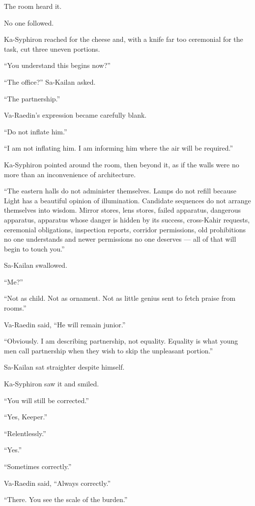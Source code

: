 The room heard it.\par
No one followed.\par
Ka-Syphiron reached for the cheese and, with a knife far too ceremonial for the task, cut three uneven portions.\par
“You understand this begins now?”\par
“The office?” Sa-Kailan asked.\par
“The partnership.”\par
Va-Raedin’s expression became carefully blank.\par
“Do not inflate him.”\par
“I am not inflating him. I am informing him where the air will be required.”\par
Ka-Syphiron pointed around the room, then beyond it, as if the walls were no more than an inconvenience of architecture.\par
“The eastern halls do not administer themselves. Lamps do not refill because Light has a beautiful opinion of illumination. Candidate sequences do not arrange themselves into wisdom. Mirror stores, lens stores, failed apparatus, dangerous apparatus, apparatus whose danger is hidden by its success, cross-Kahir requests, ceremonial obligations, inspection reports, corridor permissions, old prohibitions no one understands and newer permissions no one deserves — all of that will begin to touch you.”\par
Sa-Kailan swallowed.\par
“Me?”\par
“Not as child. Not as ornament. Not as little genius sent to fetch praise from rooms.”\par
Va-Raedin said, “He will remain junior.”\par
“Obviously. I am describing partnership, not equality. Equality is what young men call partnership when they wish to skip the unpleasant portion.”\par
Sa-Kailan sat straighter despite himself.\par
Ka-Syphiron saw it and smiled.\par
“You will still be corrected.”\par
“Yes, Keeper.”\par
“Relentlessly.”\par
“Yes.”\par
“Sometimes correctly.”\par
Va-Raedin said, “Always correctly.”\par
“There. You see the scale of the burden.”\par
